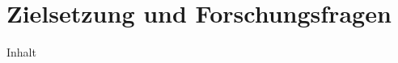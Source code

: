 \section{Zielsetzung und Forschungsfragen}
\label{sec:01-03_objectives-and-research-questions}

Inhalt
